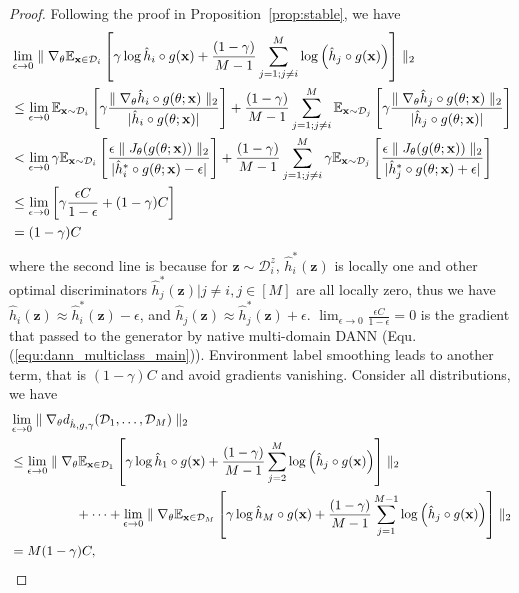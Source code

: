 \documentclass{article} \usepackage{iclr2023_conference,times}
\newcommand{\E}{\mathbb{E}}
\newcommand{\myref}[1]{Equ. (\ref{#1})}
\newcommand{\z}{\mathbf{z}}
\newcommand{\D}{\mathcal{D}}
\begin{document}
\begin{proof}
Following the proof in Proposition~\ref{prop:stable}, we have
\begin{equation}
\begin{aligned}
 &\lim_{\epsilon\rightarrow0}\parallel\nabla_\theta\E_{\x\in \D_i}\left[\gamma\log \hat{h}_i\circ g(\x)+\frac{(1-\gamma)}{M-1}\sum_{j=1;j\neq i}^M\log\left(\hat{h}_j\circ g(\x)\right) \right] \parallel_2\\
 &\leq  \lim_{\epsilon\rightarrow0}\E_{\x\sim \D_i}\left[\gamma\frac{\parallel\nabla_\theta\hat{h}_i\circ g(\theta;\x)\parallel_2}{|\hat{h}_i\circ g(\theta;\x)| }\right]
 +\frac{(1-\gamma)}{M-1}\sum_{j=1;j\neq i}^M \E_{\x\sim \D_j}\left[\gamma\frac{\parallel\nabla_\theta\hat{h}_j\circ g(\theta;\x)\parallel_2}{|\hat{h}_j\circ g(\theta;\x)| }\right]\\
 &<  \lim_{\epsilon\rightarrow0}\gamma\E_{\x\sim \D_i}\left[\frac{\epsilon \parallel J_\theta(g(\theta;\x))\parallel_2}{|\hat{h}^*_i\circ g(\theta;\x)-\epsilon| }\right]
 +\frac{(1-\gamma)}{M-1}\sum_{j=1;j\neq i}^M \gamma\E_{\x\sim \D_j}\left[\frac{\epsilon \parallel J_\theta(g(\theta;\x))\parallel_2}{|\hat{h}_j^*\circ g(\theta;\x)+\epsilon| }\right]\\
  &\leq \lim_{\epsilon\rightarrow0}\left[\gamma\frac{\epsilon C }{1-\epsilon }+(1-\gamma)C\right]\\
  & =(1-\gamma)C
\end{aligned}\end{equation}
where the second line is because for $\z\sim\D_i^z$, $\hat{h}_i^*(\z)$ is locally one and other optimal discriminators $\hat{h}_j^*(\z)|j\neq i,j\in[M]$ are all locally zero, thus we have $\hat{h}_i(\z)\approx\hat{h}_i^*(\z)-\epsilon$, and $\hat{h}_j(\z)\approx\hat{h}_j^*(\z)+\epsilon$. $\lim_{\epsilon\rightarrow0}\frac{\epsilon C }{1-\epsilon }=0$ is the gradient that passed to the generator by native multi-domain DANN (\myref{equ:dann_multiclass_main}). Environment label smoothing leads to another term, that is $(1-\gamma)C$ and avoid gradients vanishing. Consider all distributions, we have
\begin{equation}
\begin{aligned}
&\lim_{\epsilon\rightarrow0} \parallel\nabla_\theta d_{\hat{h},g,\gamma}(\D_1,\dots,\D_M) \parallel_2\\
&\leq \lim_{\epsilon\rightarrow0}\parallel\nabla_\theta\E_{\x\in \D_1}\left[\gamma\log \hat{h}_1\circ g(\x)+\frac{(1-\gamma)}{M-1}\sum_{j=2}^M\log\left(\hat{h}_j\circ g(\x)\right) \right] \parallel_2\\
&\quad\quad\quad\quad\quad + \dots + 
\lim_{\epsilon\rightarrow0}\parallel\nabla_\theta\E_{\x\in \D_M}\left[\gamma\log \hat{h}_M\circ g(\x)+\frac{(1-\gamma)}{M-1}\sum_{j=1}^{M-1}\log\left(\hat{h}_j\circ g(\x)\right) \right] \parallel_2\\
&=M(1-\gamma)C ,
 \end{aligned}\end{equation}

\end{proof}
\end{document}
